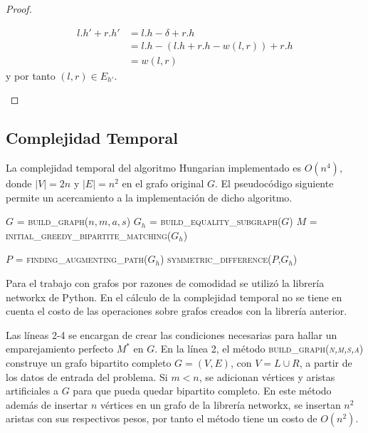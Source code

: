 \documentclass[10pt]{article} %
\begin{document}
\begin{proof}
\begin{enumerate}
		\begin{align*}
			l.h' + r.h' &= l.h - \delta + r.h\\
			&= l.h - (l.h + r.h -w(l,r)) + r.h\\
			&= w(l,r)			
		\end{align*}
		y por tanto $(l,r) \in E_{h'}$. 
		
		
	\end{enumerate}
	
\end{proof}


\subsection{Complejidad Temporal}

La complejidad temporal del algoritmo Hungarian implementado es $O(n^4)$, donde $|V|=2n$ y $|E|=n^2$ en el grafo original $G$. El pseudoc\'odigo siguiente permite un acercamiento a la implementaci\'on de dicho algoritmo.

\vspace{1em}
\begin{algorithmic}[1]
	\State $G$ = \textsc{build\_graph($n, m, a, s$)}
	\State $G_h$ = \textsc{build\_equality\_subgraph($G$})
	\State $M$ =\textsc{ initial\_greedy\_bipartite\_matching($G_h$)}
	
	\State $P$ = \textsc{finding\_augmenting\_path($G_h$)}
	\State \textsc{symmetric\_difference($P$,$G_h$)}
	
	
	\EndWhile
	\EndFunction 
\end{algorithmic}
\vspace{1em}

Para el trabajo con grafos por razones de comodidad se utiliz\'o la librer\'ia networkx de Python. En el c\'alculo de la complejidad temporal no se tiene en cuenta el costo de las operaciones sobre grafos creados con la librer\'ia anterior.

Las l\'ineas 2-4 se encargan de crear las condiciones necesarias para hallar un emparejamiento perfecto $M^*$ en $G$. En la l\'inea 2, el m\'etodo \textsc{build\_graph(\textit{n,m,s,a})} construye un grafo bipartito completo $G = (V,E)$, con $V = L \cup R$, a partir de los datos de entrada del problema. Si $m<n$, se adicionan v\'ertices y aristas artificiales a $G$ para que pueda quedar bipartito completo. En este m\'etodo adem\'as de insertar $n$ v\'ertices en un grafo de la librer\'ia networkx, se insertan $n^2$ aristas con sus respectivos pesos, por tanto el m\'etodo tiene un costo de $O(n^2)$. 
\end{document}
